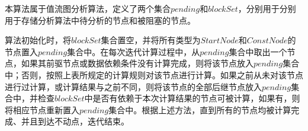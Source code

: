 %

本算法属于值流图分析算法，定义了两个集合$ pending $和$ blockSet $，分别用于分别用于存储分析算法中待分析的节点和被阻塞的节点。

算法初始化时，将$ blockSet $集合置空，并将所有类型为$ StartNode $和$ ConstNode $的节点置入$ pending $集合中。在每次迭代计算过程中，从$ pending $集合中取出一个节点，如果其前驱节点或数据依赖条件没有计算完成，则将该节点放入$ pending $集合中；否则，按照上表所规定的计算规则对该节点进行计算。如果之前从未对该节点进行过计算，或计算结果与之前不同，则将该节点的全部后继节点放入$ pending $集合中，并检查$ blockSet $中是否有依赖于本次计算结果的节点可被计算，如果有，则将相应节点重新置入$ pending $集合中。根据上述方法，直到所有的节点均被计算完成、并且到达不动点，迭代结束。

